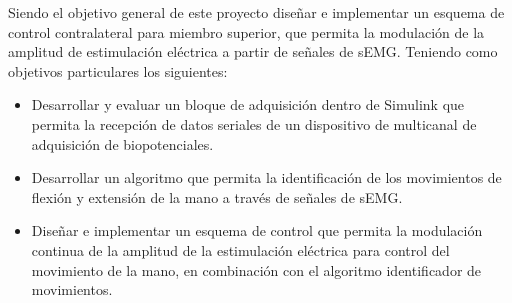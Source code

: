 


Siendo el objetivo general de este proyecto diseñar e implementar un esquema de control contralateral para miembro superior, que permita la modulación de la amplitud de estimulación eléctrica a partir de señales de sEMG. Teniendo como objetivos particulares los siguientes:

\begin{itemize}
	\item Desarrollar y evaluar un bloque de adquisición dentro de Simulink que permita la recepción de datos seriales de un dispositivo de multicanal de adquisición de biopotenciales.
	\item Desarrollar un algoritmo que permita la identificación de los movimientos de flexión y extensión de la mano a través de señales de sEMG.
	\item Diseñar e implementar un esquema de control que permita la modulación continua de la amplitud de la estimulación eléctrica para control del movimiento de la mano, en combinación con el algoritmo identificador de movimientos.
\end{itemize}
